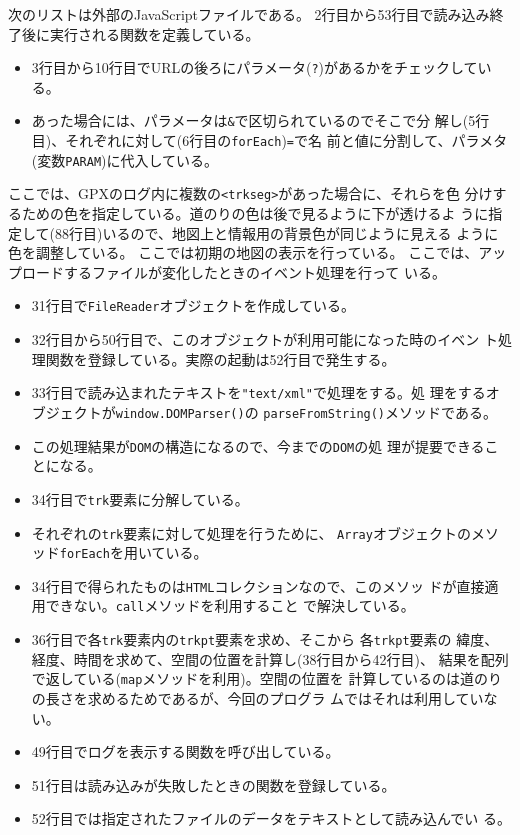  次のリストは外部のJavaScriptファイルである。
 2行目から53行目で読み込み終了後に実行される関数を定義している。
 \begin{itemize}
	\item 3行目から10行目でURLの後ろにパラメータ(\Verb+?+)があるかをチェックしている。
	\item あった場合には、パラメータは\Verb+&+で区切られているのでそこで分
				解し(5行目)、それぞれに対して(6行目の\Verb+forEach+)\Verb+=+で名
				前と値に分割して、パラメタ(変数\Verb+PARAM+)に代入している。
 \end{itemize}
 ここでは、GPXのログ内に複数の\Verb+<trkseg>+があった場合に、それらを色
 分けするための色を指定している。道のりの色は後で見るように下が透けるよ
 うに指定して(88行目)いるので、地図上と情報用の背景色が同じように見える
 ように色を調整している。
 ここでは初期の地図の表示を行っている。
 ここでは、アップロードするファイルが変化したときのイベント処理を行って
 いる。
 \begin{itemize}
	\item 31行目で\Verb+FileReader+オブジェクトを作成している。
	\item 32行目から50行目で、このオブジェクトが利用可能になった時のイベン
				ト処理関数を登録している。実際の起動は52行目で発生する。
	\item 33行目で読み込まれたテキストを\Verb+"text/xml"+で処理をする。処
				理をするオブジェクトが\Verb+window.DOMParser()+の
				\Verb+parseFromString()+メソッドである。
	\item この処理結果が\Verb+DOM+の構造になるので、今までの\Verb+DOM+の処
				理が提要できることになる。
	\item 34行目で\texttt{trk}要素に分解している。
	\item それぞれの\texttt{trk}要素に対して処理を行うために、
				\texttt{Array}オブジェクトのメソッド\texttt{forEach}を用いている。
	\item 34行目で得られたものは\texttt{HTML}コレクションなので、このメソッ
				ドが直接適用できない。\texttt{call}メソッドを利用すること
				で解決している。
	\item 36行目で各\texttt{trk}要素内の\texttt{trkpt}要素を求め、そこから
				各\texttt{trkpt}要素の
				緯度、経度、時間を求めて、空間の位置を計算し(38行目から42行目)、
				結果を配列で返している(\texttt{map}メソッドを利用)。空間の位置を
				計算しているのは道のりの長さを求めるためであるが、今回のプログラ
				ムではそれは利用していない。
	\item 49行目でログを表示する関数を呼び出している。
	\item 51行目は読み込みが失敗したときの関数を登録している。
	\item 52行目では指定されたファイルのデータをテキストとして読み込んでい
				る。
 \end{itemize}

